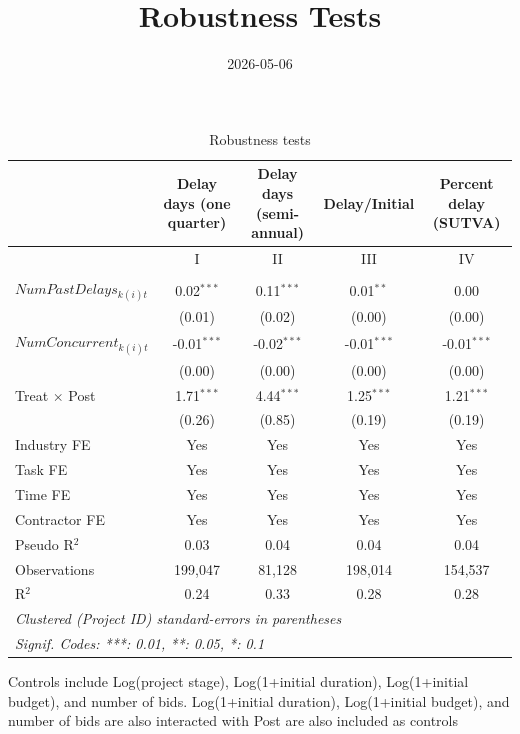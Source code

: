 \documentclass[
]{article}
\title{Robustness Tests}
\author{}
\date{\vspace{-2.5em}2026-05-06}
\begin{document}
\maketitle

\begin{table}[htbp]
   \caption{Robustness tests}
   \centering
   \small
   \begin{tabular}{lcccc}
      \toprule
      \midrule  & Delay days (one quarter) & Delay days (semi-annual) & Delay/Initial & Percent delay (SUTVA)\\
      \midrule  & I & II & III & IV\\
      \midrule \\
      $NumPastDelays_{k(i)t}$ & 0.02$^{***}$  & 0.11$^{***}$  & 0.01$^{**}$   & 0.00\\   
                              & (0.01)        & (0.02)        & (0.00)        & (0.00)\\   
      $NumConcurrent_{k(i)t}$ & -0.01$^{***}$ & -0.02$^{***}$ & -0.01$^{***}$ & -0.01$^{***}$\\   
                              & (0.00)        & (0.00)        & (0.00)        & (0.00)\\   
      Treat $\times$ Post     & 1.71$^{***}$  & 4.44$^{***}$  & 1.25$^{***}$  & 1.21$^{***}$\\   
                              & (0.26)        & (0.85)        & (0.19)        & (0.19)\\   
      \midrule 
      Industry FE             & Yes           & Yes           & Yes           & Yes\\  
      Task FE                 & Yes           & Yes           & Yes           & Yes\\  
      Time FE                 & Yes           & Yes           & Yes           & Yes\\  
      Contractor FE           & Yes           & Yes           & Yes           & Yes\\  
      Pseudo R$^2$            & 0.03          & 0.04          & 0.04          & 0.04\\  
      Observations            & 199,047       & 81,128        & 198,014       & 154,537\\  
      R$^2$                   & 0.24          & 0.33          & 0.28          & 0.28\\  
      \midrule
      \multicolumn{5}{l}{\emph{Clustered (Project ID) standard-errors in parentheses}}\\
      \multicolumn{5}{l}{\emph{Signif. Codes: ***: 0.01, **: 0.05, *: 0.1}}\\
   \end{tabular}
   
   \par \raggedright 
   Controls include Log(project stage), Log(1+initial duration), Log(1+initial budget), and number of bids. Log(1+initial duration), Log(1+initial budget), and number of bids are also interacted with Post are also included as controls
\end{table}
\end{document}
